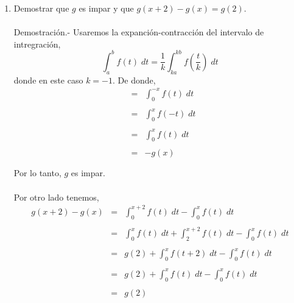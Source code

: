 \begin{enumerate}[\bfseries  1.]
\begin{enumerate}[\bfseries (a)]
	    \item Demostrar que $g$ es impar y que $g(x+2)-g(x)=g(2)$.\\\\
		Demostración.-\; Usaremos la expanción-contracción del intervalo de intregración,
		$$\int_a^b f(t)\; dt = \dfrac{1}{k}\int_{ka}^{kb} f\left(\dfrac{t}{k}\right)\; dt$$
		donde en este caso $k=-1$. De donde,
		$$\begin{array}{rcl}
		    &=&\displaystyle\int_0^{-x} f(t)\; dt\\\\
		    &=&\displaystyle\int_0^x f(-t)\; dt\\\\
		    &=&\displaystyle\int_0^x f(t)\; dt\\\\
		    &=&-g(x)\\\\
		\end{array}$$
		Por lo tanto, $g$ es impar.\\\\
		Por otro lado tenemos,
		$$\begin{array}{rcl}
		    g(x+2)-g(x)&=&\displaystyle\int_0^{x+2} f(t)\; dt - \int_0^x f(t)\; dt\\\\
			       &=&\displaystyle\int_0^{x} f(t)\; dt + \int_2^{x+2} f(t)\; dt - \int_0^x f(t)\; dt\\\\
			       &=&g(2)+\displaystyle\int_0^{x}f(t+2)\; dt - \int_0^x f(t)\; dt\\\\
			       &=&g(2)+\displaystyle\int_0^{x}f(t)\; dt - \int_0^x f(t)\; dt\\\\
			       &=&g(2)\\\\
		\end{array}$$


\end{enumerate}
\end{enumerate}
